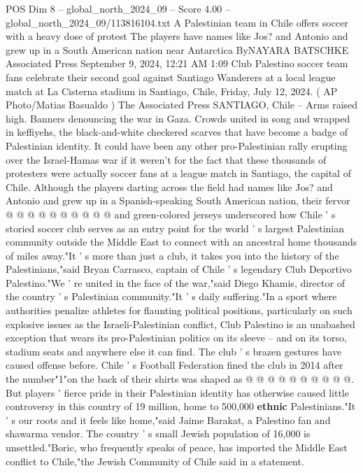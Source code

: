 \begin{textsample}{POS Dim 8 – global\_north\_2024\_09 – Score 4.00 – global\_north\_2024\_09/113816104.txt}  \label{ex:f8_pos_292}
A Palestinian team in Chile offers soccer with a heavy dose of protest The players have names like Jos? and Antonio and grew up in a South American nation near Antarctica ByNAYARA BATSCHKE Associated Press September 9, 2024, 12:21 AM 1:09 Club Palestino soccer team fans celebrate their second goal against Santiago Wanderers at a local league match at La Cisterna stadium in Santiago, Chile, Friday, July 12, 2024. ( AP Photo/Matias Basualdo ) The Associated Press SANTIAGO, Chile -- Arms raised high.
Banners denouncing the war in Gaza.
Crowds united in song and wrapped in keffiyehs, the black-and-white checkered scarves that have become a badge of Palestinian identity.
It could have been any other pro-Palestinian rally erupting over the Israel-Hamas war if it weren't for the fact that these thousands of protesters were actually soccer fans at a league match in Santiago, the capital of Chile.
Although the players darting across the field had names like Jos? and Antonio and grew up in a Spanish-speaking South American nation, their fervor @ @ @ @ @ @ @ @ @ @ and green-colored jerseys underscored how Chile ' s storied soccer club serves as an entry point for the world ' s largest Palestinian community outside the Middle East to connect with an ancestral home thousands of miles away."It ' s more than just a club, it takes you into the history of the Palestinians,"said Bryan Carrasco, captain of Chile ' s legendary Club Deportivo Palestino."We ' re united in the face of the war,"said Diego Khamis, director of the country ' s Palestinian community."It ' s daily suffering."In a sport where authorities penalize athletes for flaunting political positions, particularly on such explosive issues as the Israeli-Palestinian conflict, Club Palestino is an unabashed exception that wears its pro-Palestinian politics on its sleeve -- and on its torso, stadium seats and anywhere else it can find.
The club ' s brazen gestures have caused offense before.
Chile ' s Football Federation fined the club in 2014 after the number"1"on the back of their shirts was shaped as @ @ @ @ @ @ @ @ @ @.
But players ' fierce pride in their Palestinian identity has otherwise caused little controversy in this country of 19 million, home to 500,000 \textbf{ethnic} Palestinians."It ' s our roots and it feels like home,"said Jaime Barakat, a Palestino fan and shawarma vendor.
The country ' s small Jewish population of 16,000 is unsettled."Boric, who frequently speaks of peace, has imported the Middle East conflict to Chile,"the Jewish Community of Chile said in a statement.

\end{textsample}
